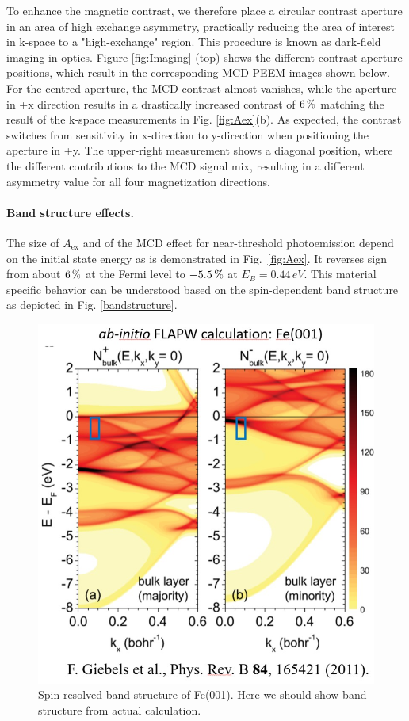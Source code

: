 \documentclass[prl,twocolumn,floatfix]{revtex4-2}
\begin{document}
To enhance the magnetic contrast, we therefore place a circular contrast aperture in an area of high exchange asymmetry, practically reducing the area of interest in k-space to a "high-exchange" region. This procedure is known as dark-field imaging in optics. 
Figure \ref{fig:Imaging} (top) shows the different contrast aperture positions, which result in the corresponding MCD PEEM images shown below. For the centred aperture, the MCD contrast almost vanishes, while the aperture in +x direction results in a drastically increased contrast of $\unit[6]{\%}$ matching the result of the k-space measurements in Fig. \ref{fig:Aex}(b). 
As expected, the contrast switches from sensitivity in x-direction to y-direction when positioning the aperture in +y. The upper-right measurement shows a diagonal position, where the different contributions to the MCD signal mix, resulting in a different asymmetry value for all four magnetization directions. 


\paragraph{Band structure effects.}

The size of $A_{\mathrm{ex}}$ and of the MCD effect for near-threshold photoemission depend on the initial state energy as is demonstrated in Fig.~\ref{fig:Aex}. It reverses sign from about $\unit[6]{\%}$ at the Fermi level to $\unit[-5.5]{\%}$ at $E_B= 0.44\,eV$. This material specific behavior can be understood based on the spin-dependent band structure as depicted in Fig. \ref{bandstructure}.


\begin{figure}
    \centering
    \includegraphics[width = 0.8\columnwidth]{FLAPW_bandstructure.jpg}
    \caption{Spin-resolved band structure of Fe(001). Here we should show band structure from actual calculation.}
    \label{fig:bandstructure}
\end{figure}
\end{document}
